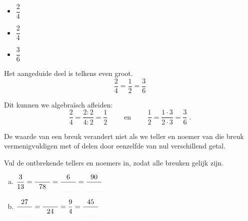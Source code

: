 \documentclass[12pt]{article}
\begin{document}
\begin{itemize}
  \item $\dfrac{2}{4}$\hspace*{1em}
  \item $\dfrac{2}{4}$\hspace*{1em}
  \item $\dfrac{3}{6}$\hspace*{1em}
\end{itemize}

Het aangeduide deel is telkens even groot.
$$\dfrac{2}{4}=\dfrac{1}{2}=\dfrac{3}{6}$$

Dit kunnen we algebraïsch afleiden:
$$\dfrac{2}{4}=\dfrac{2:2}{4:2}=\dfrac{1}{2} \qquad\mbox{ en }\qquad\dfrac{1}{2}=\dfrac{1\cdot 3}{2\cdot 3}=\dfrac{3}{6}\;.$$

\begin{onthoud}
De waarde van een breuk verandert niet als we teller en noemer van die breuk vermenigvuldigen met of delen door eenzelfde van nul verschillend getal.
\end{onthoud}

\begin{exercise}
Vul de ontbrekende tellers en noemers in, zodat alle breuken gelijk zijn.
\begin{enumerate}[(a)]
  \item $\dfrac{3}{13}=\dfrac{\arule{0.75cm}}{78}=\dfrac{6}{\arule{0.75cm}}=\dfrac{90}{\arule{0.75cm}}$
  \item $\dfrac{27}{\arule{0.75cm}}=\dfrac{\arule{0.75cm}}{24}=\dfrac{9}{4}=\dfrac{45}{\arule{0.75cm}}$
\end{enumerate}
\end{exercise}
\end{document}
